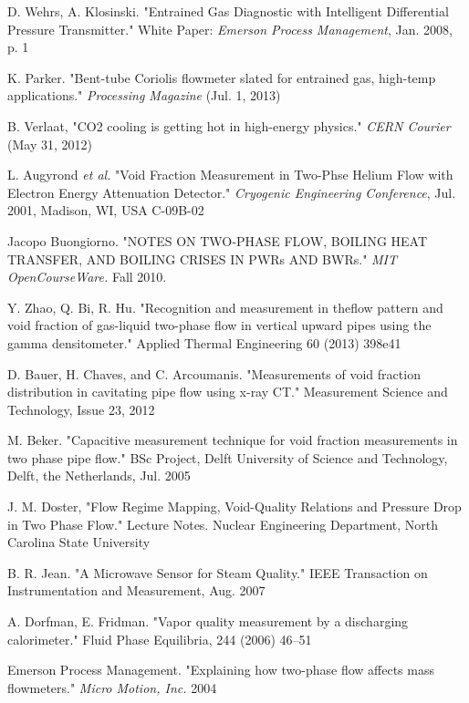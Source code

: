 \documentclass{report}
\begin{document}
\begin{thebibliography}{9}
D. Wehrs, A. Klosinski. "Entrained Gas Diagnostic with Intelligent Differential Pressure Transmitter." White Paper: \textit{Emerson Process Management}, Jan. 2008, p. 1

K. Parker. "Bent-tube Coriolis flowmeter slated for entrained gas, high-temp applications." \textit{Processing Magazine} (Jul. 1, 2013)

B. Verlaat, "CO2 cooling is getting hot in high-energy physics." \textit{CERN Courier} (May 31, 2012)

L. Augyrond \textit{et al.} "Void Fraction Measurement in Two-Phse Helium Flow with Electron Energy Attenuation Detector." \textit{Cryogenic Engineering Conference}, Jul. 2001, Madison, WI, USA C-09B-02

Jacopo Buongiorno. "NOTES ON TWO‐PHASE FLOW, BOILING HEAT TRANSFER, AND BOILING CRISES
IN PWRs AND BWRs." \textit{MIT OpenCourseWare.} Fall 2010.

Y. Zhao, Q. Bi, R. Hu. "Recognition and measurement in theflow pattern and void fraction of gas-liquid two-phase flow in vertical upward pipes using the gamma densitometer." Applied Thermal Engineering 60 (2013) 398e41

D. Bauer, H. Chaves, and C. Arcoumanis. "Measurements of void fraction distribution in cavitating pipe flow
using x-ray CT." Measurement Science and Technology, Issue 23, 2012

M. Beker. "Capacitive measurement technique for void fraction measurements in two phase pipe flow." BSc Project, Delft University of Science and Technology, Delft, the Netherlands, Jul. 2005

J. M. Doster, "Flow Regime Mapping, Void-Quality Relations and Pressure Drop in Two Phase Flow." Lecture Notes. Nuclear Engineering Department, North Carolina State University 

B. R. Jean. "A Microwave Sensor for Steam Quality." IEEE Transaction on Instrumentation and Measurement, Aug. 2007

A. Dorfman, E. Fridman. "Vapor quality measurement by a discharging calorimeter." Fluid Phase Equilibria, 244 (2006) 46–51

Emerson Process Management. "Explaining how two-phase flow affects mass flowmeters." \textit{Micro Motion, Inc.} 2004

\end{thebibliography}
\appendix
{} 
\singlespacing
\end{document}
